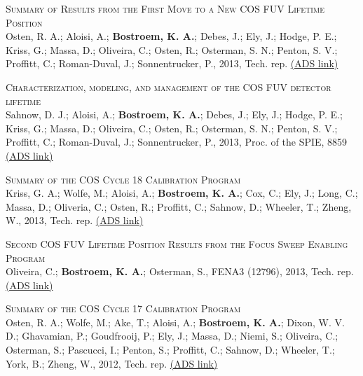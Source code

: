 \begin{revnumerate}[24]
\item{\textsc{Summary of Results from the First Move to a New COS FUV Lifetime Position}\\
Osten, R. A.; Aloisi, A.; \textbf{Bostroem, K. A.};  Debes, J.; Ely, J.; Hodge, P. E.; Kriss, G.; Massa, D.; Oliveira, C.; Osten, R.; Osterman, S. N.; Penton, S. V.; Proffitt, C.; Roman-Duval, J.; Sonnentrucker, P., 2013, Tech. rep. 
\color{blue}\href{https://ui.adsabs.harvard.edu/#abs/2013cos..rept...16O/abstract}{(ADS link)}\color{black}}\\ %

\item{\textsc{Characterization, modeling, and management of the COS FUV detector lifetime}\\
Sahnow, D. J.; Aloisi, A.; \textbf{Bostroem, K. A.}; Debes, J.; Ely, J.; Hodge, P. E.; Kriss, G.; Massa, D.; Oliveira, C.; Osten, R.; Osterman, S. N.; Penton, S. V.; Proffitt, C.; Roman-Duval, J.; Sonnentrucker, P., 2013, Proc. of the SPIE, 8859 
\color{blue}\href{https://ui.adsabs.harvard.edu/#abs/2013SPIE.8859E..0SS/abstract}{(ADS link)}\color{black}}\\

\item{\textsc{Summary of the COS Cycle 18 Calibration Program}\\
Kriss, G. A.; Wolfe, M.; Aloisi, A.; \textbf{Bostroem, K. A.}; Cox, C.; Ely, J.; Long, C.; Massa, D.; Oliveria, C.; Osten, R.; Proffitt, C.; Sahnow, D.; Wheeler, T.; Zheng, W., 2013, Tech. rep. 
\color{blue}\href{https://ui.adsabs.harvard.edu/#abs/2013cos..rept....4K/abstract}{(ADS link)}\color{black}}\\ %

\item{\textsc{Second COS FUV Lifetime Position Results from the Focus Sweep Enabling Program}\\
Oliveira, C.; \textbf{Bostroem, K. A.}; Osterman, S., FENA3 (12796), 2013, Tech. rep. 
\color{blue}\href{https://ui.adsabs.harvard.edu/#abs/2013cos..rept....1O/abstract}{(ADS link)}\color{black}}\\ %

\item{\textsc{Summary of the COS Cycle 17 Calibration Program}\\
Osten, R. A.; Wolfe, M.; Ake, T.; Aloisi, A.; \textbf{Bostroem, K. A.}; Dixon, W. V. D.; Ghavamian, P.; Goudfrooij, P.; Ely, J.; Massa, D.; Niemi, S.; Oliveira, C.; Osterman, S.; Pascucci, I.; Penton, S.; Proffitt, C.; Sahnow, D.; Wheeler, T.; York, B.; Zheng, W., 2012, Tech. rep. 
\color{blue}\href{https://ui.adsabs.harvard.edu/#abs/2012cos..rept....2O/abstract}{(ADS link)}\color{black}}\\ %


\end{revnumerate}
